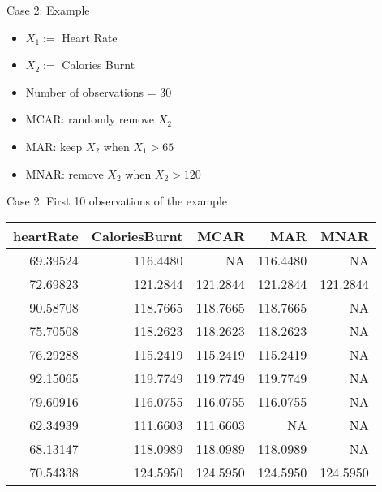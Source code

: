\documentclass[ignorenonframetext,]{beamer}
\providecommand{\tightlist}{%
  \setlength{\itemsep}{0pt}\setlength{\parskip}{0pt}}
\begin{document}
\begin{frame}{Case 2: Example}

\begin{itemize}[<+->]
\tightlist
\item
  \(X_{1}:=\) Heart Rate
\item
  \(X_{2}:=\) Calories Burnt
\item
  Number of observations = 30
\item
  MCAR: randomly remove \(X_{2}\)
\item
  MAR: keep \(X_{2}\) when \(X_{1} > 65\)
\item
  MNAR: remove \(X_{2}\) when \(X_{2} > 120\)
\end{itemize}

\end{frame}

\begin{frame}{Case 2: First 10 observations of the example}

\begin{longtable}[]{@{}rrrrr@{}}
\toprule
heartRate & CaloriesBurnt & MCAR & MAR & MNAR\tabularnewline
\midrule
\endhead
69.39524 & 116.4480 & NA & 116.4480 & NA\tabularnewline
72.69823 & 121.2844 & 121.2844 & 121.2844 & 121.2844\tabularnewline
90.58708 & 118.7665 & 118.7665 & 118.7665 & NA\tabularnewline
75.70508 & 118.2623 & 118.2623 & 118.2623 & NA\tabularnewline
76.29288 & 115.2419 & 115.2419 & 115.2419 & NA\tabularnewline
92.15065 & 119.7749 & 119.7749 & 119.7749 & NA\tabularnewline
79.60916 & 116.0755 & 116.0755 & 116.0755 & NA\tabularnewline
62.34939 & 111.6603 & 111.6603 & NA & NA\tabularnewline
68.13147 & 118.0989 & 118.0989 & 118.0989 & NA\tabularnewline
70.54338 & 124.5950 & 124.5950 & 124.5950 & 124.5950\tabularnewline
\bottomrule
\end{longtable}

\end{frame}
\end{document}
